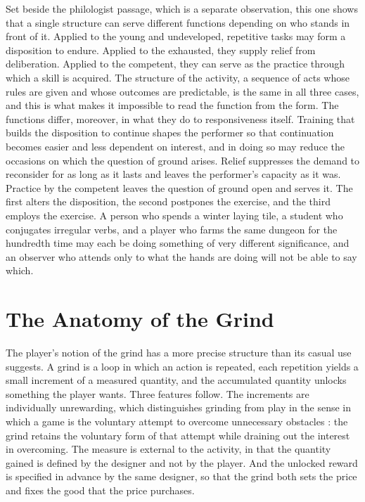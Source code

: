 \documentclass[11pt]{article}
\begin{document}
Set beside the philologist passage, which is a separate observation, this one shows that a single structure can serve different functions depending on who stands in front of it. Applied to the young and undeveloped, repetitive tasks may form a disposition to endure. Applied to the exhausted, they supply relief from deliberation. Applied to the competent, they can serve as the practice through which a skill is acquired. The structure of the activity, a sequence of acts whose rules are given and whose outcomes are predictable, is the same in all three cases, and this is what makes it impossible to read the function from the form. The functions differ, moreover, in what they do to responsiveness itself. Training that builds the disposition to continue shapes the performer so that continuation becomes easier and less dependent on interest, and in doing so may reduce the occasions on which the question of ground arises. Relief suppresses the demand to reconsider for as long as it lasts and leaves the performer's capacity as it was. Practice by the competent leaves the question of ground open and serves it. The first alters the disposition, the second postpones the exercise, and the third employs the exercise. A person who spends a winter laying tile, a student who conjugates irregular verbs, and a player who farms the same dungeon for the hundredth time may each be doing something of very different significance, and an observer who attends only to what the hands are doing will not be able to say which.

\section{The Anatomy of the Grind}

The player's notion of the grind has a more precise structure than its casual use suggests. A grind is a loop in which an action is repeated, each repetition yields a small increment of a measured quantity, and the accumulated quantity unlocks something the player wants. Three features follow. The increments are individually unrewarding, which distinguishes grinding from play in the sense in which a game is the voluntary attempt to overcome unnecessary obstacles \cite{suits1978}: the grind retains the voluntary form of that attempt while draining out the interest in overcoming. The measure is external to the activity, in that the quantity gained is defined by the designer and not by the player. And the unlocked reward is specified in advance by the same designer, so that the grind both sets the price and fixes the good that the price purchases.
\end{document}
